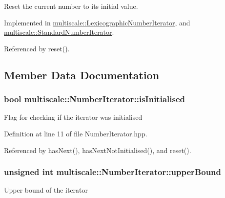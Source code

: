 Reset the current number to its initial value. 



Implemented in \hyperlink{classmultiscale_1_1LexicographicNumberIterator_a18311f68a49156a415c817a947abcd7d}{multiscale\-::\-Lexicographic\-Number\-Iterator}, and \hyperlink{classmultiscale_1_1StandardNumberIterator_a678d43170a27106e1d8c5475b7088d9e}{multiscale\-::\-Standard\-Number\-Iterator}.



Referenced by reset().



\subsection{Member Data Documentation}
\hypertarget{classmultiscale_1_1NumberIterator_ae3d929444e14677de0b616a059380f3f}{
\subsubsection[{is\-Initialised}]{\setlength{\rightskip}{0pt plus 5cm}bool multiscale\-::\-Number\-Iterator\-::is\-Initialised\hspace{0.3cm}{\ttfamily [protected]}}}\label{classmultiscale_1_1NumberIterator_ae3d929444e14677de0b616a059380f3f}
Flag for checking if the iterator was initialised 

Definition at line 11 of file Number\-Iterator.\-hpp.



Referenced by has\-Next(), has\-Next\-Not\-Initialised(), and reset().

\hypertarget{classmultiscale_1_1NumberIterator_a56a5558958778bbde64e249d67cba886}{
\subsubsection[{upper\-Bound}]{\setlength{\rightskip}{0pt plus 5cm}unsigned int multiscale\-::\-Number\-Iterator\-::upper\-Bound\hspace{0.3cm}{\ttfamily [protected]}}}\label{classmultiscale_1_1NumberIterator_a56a5558958778bbde64e249d67cba886}
Upper bound of the iterator 


